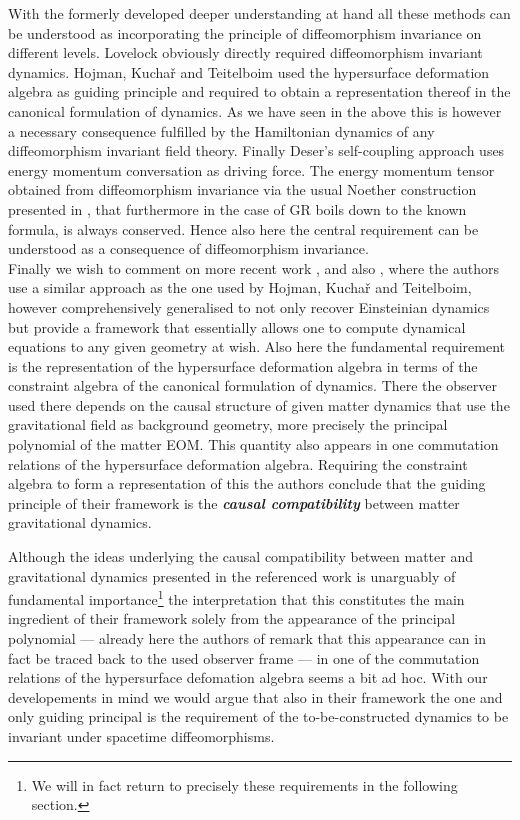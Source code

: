 \documentclass[a4paper,12pt, DIV=14, BCOR=5mm, twoside, headsepline]{scrbook}
\begin{document}
With the formerly developed deeper understanding at hand all these methods can be understood as incorporating the principle of diffeomorphism invariance on different levels. Lovelock obviously directly required diffeomorphism invariant dynamics. Hojman, Kuchař and Teitelboim used the hypersurface deformation algebra as guiding principle and required to obtain a representation thereof in the canonical formulation of dynamics. As we have seen in the above this is however a necessary consequence fulfilled by the Hamiltonian dynamics of any diffeomorphism invariant field theory. Finally Deser's self-coupling approach uses energy momentum conversation as driving force. The energy momentum tensor obtained from diffeomorphism invariance via the usual Noether construction presented in \cite{Gotay1992StressEnergyMomentumTA}, that furthermore in the case of GR boils down to the known formula, is always conserved. Hence also here the central requirement can be understood as a consequence of diffeomorphism invariance. \\

Finally we wish to comment on more recent work \cite{2018PhRvD..97h4036D}, \cite{2012PhRvD..85j4042G} and also \cite{2017arXiv170803870S}, where the authors use a similar approach as the one used by Hojman, Kuchař and Teitelboim, however comprehensively generalised to not only recover Einsteinian dynamics but provide a framework that essentially allows one to compute dynamical equations to any given geometry at wish. Also here the fundamental requirement is the representation of the hypersurface deformation algebra in terms of the constraint algebra of the canonical formulation of dynamics. There the observer used there depends on the causal structure of given matter dynamics that use the gravitational field as background geometry, more precisely the principal polynomial of the matter EOM. This quantity also appears in one commutation relations of the hypersurface deformation algebra. Requiring the constraint algebra to form a representation of this the authors conclude that the guiding principle of their framework is the \textit{\textbf{causal compatibility}} between matter gravitational dynamics.

Although the ideas underlying the causal compatibility between matter and gravitational dynamics presented in the referenced work is unarguably of fundamental importance\footnote{We will in fact return to precisely these requirements in the following section.} the interpretation that this constitutes the main ingredient of their framework solely from the appearance of the principal polynomial --- already here the authors of \cite{2018PhRvD..97h4036D} remark that this appearance can in fact be traced back to the used observer frame --- in one of the commutation relations of the hypersurface defomation algebra seems a bit ad hoc.
With our developements in mind we would argue that also in their framework the one and only guiding principal is the requirement of the to-be-constructed dynamics to be invariant under spacetime diffeomorphisms.
\end{document}
